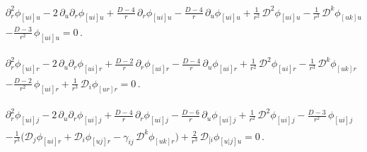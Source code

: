 \documentclass[a4paper,12pt]{article}
\begin{document}
\begin{equation}
\begin{aligned}
&\partial_r^2 \phi_{[ui]u}
-2\,\partial_u\partial_r \phi_{[ui]u}
+\frac{D-4}{r}\,\partial_r \phi_{[ui]u}
-\frac{D-4}{r}\,\partial_u \phi_{[ui]u}
+\frac{1}{r^2}\,\mathcal{D}^2 \phi_{[ui]u}
-\frac{1}{r^3}\,\mathcal{D}^k \phi_{[uk]u}\\
&-\frac{D-3}{r^2}\,\phi_{[ui]u}=0\, .
\end{aligned}
\end{equation}


\begin{equation}
\begin{aligned}
&\partial_r^2 \phi_{[ui]r}
-2\,\partial_u\partial_r \phi_{[ui]r}
+\frac{D-2}{r}\,\partial_r \phi_{[ui]r}
-\frac{D-4}{r}\,\partial_u \phi_{[ui]r}
+\frac{1}{r^2}\,\mathcal{D}^2 \phi_{[ui]r}
-\frac{1}{r^3}\,\mathcal{D}^k \phi_{[uk]r}\\
&-\frac{D-2}{r^2}\,\phi_{[ui]r}
+\frac{1}{r^3}\,\mathcal{D}_i \phi_{[ur]r}=0 \, .
\end{aligned}
\end{equation}


\begin{equation}
\begin{aligned}
&\partial_r^2 \phi_{[ui]j}
-2\,\partial_u\partial_r \phi_{[ui]j}
+\frac{D-4}{r}\,\partial_r \phi_{[ui]j}
-\frac{D-6}{r}\,\partial_u \phi_{[ui]j}
+\frac{1}{r^2}\,\mathcal{D}^2 \phi_{[ui]j}
-\frac{D-3}{r^2}\,\phi_{[ui]j}
\\
&
-\frac{1}{r^3}\Big(
\mathcal{D}_j \phi_{[ui]r}
+\mathcal{D}_i \phi_{[uj]r}
-\gamma_{ij}\,\mathcal{D}^k \phi_{[uk]r}
\Big)
+\frac{2}{r^3}\,\mathcal{D}_{[i}\phi_{[u|j]u}=0 \, .
\end{aligned}
\end{equation}

\end{document}
